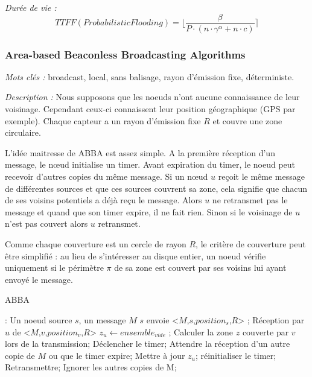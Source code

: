 \emph{Durée de vie :} $$TTFF(Probabilistic Flooding)=\lfloor \frac{\beta}{P \cdot (n\cdot \gamma^\alpha +  n\cdot c)} \rceil$$


\subsubsection{Area-based Beaconless Broadcasting Algorithms \cite{Ovalle2006}}
\emph{Mots clés :} broadcast, local, sans balisage, rayon d'émission fixe, déterministe.

\emph{Description :} Nous supposons que les noeuds n'ont aucune connaissance de leur voisinage. Cependant ceux-ci connaissent leur position géographique (GPS par exemple). Chaque capteur a un rayon d'émission fixe $R$ et couvre une zone circulaire.

L'idée maitresse de ABBA est assez simple. A la première réception d'un message, le nœud initialise un timer. Avant expiration du timer, le noeud peut recevoir d'autres copies du même message. Si un nœud $u$ reçoit le même message de différentes sources et que ces sources couvrent sa zone, cela signifie que chacun de ses voisins potentiels a déjà reçu le message. Alors $u$ ne retransmet pas le message et quand que son timer expire, il ne fait rien. Sinon si le voisinage de $u$ n'est pas couvert alors $u$ retransmet.

Comme chaque couverture est un cercle de rayon $R$, le critère de couverture peut être simplifié : au lieu de s'intéresser au disque entier, un noeud vérifie uniquement si le périmètre $\pi$ de sa zone est couvert par ses voisins lui ayant envoyé le message.


\begin{algorithm}[H]
\caption{ABBA}
\label{ABBA}
\begin{algorithmic}
\REQUIRE:
Un noeud source $s$, un message $M$
\STATE $s$ envoie  <$M$,$s$,$position_s$,$R$> ;
\STATE Réception  par  $u$ de  <$M$,$v$,$position_v$,$R$>
\STATE $z_u\leftarrow ensemble_{vide}$ ;
\STATE Calculer la zone $z$ couverte par $v$ lors de la transmission;
\STATE Déclencher le timer;
\REPEAT
    \STATE Attendre la réception d'un autre copie de $M$ ou que le timer expire;
	\STATE Mettre à jour $z_u$;
	\STATE réinitialiser le timer;
    \ENDIF
{}
    \STATE Retransmettre;
\ENDIF
     \STATE Ignorer les autres copies de M;

\end{algorithmic}
\end{algorithm}


